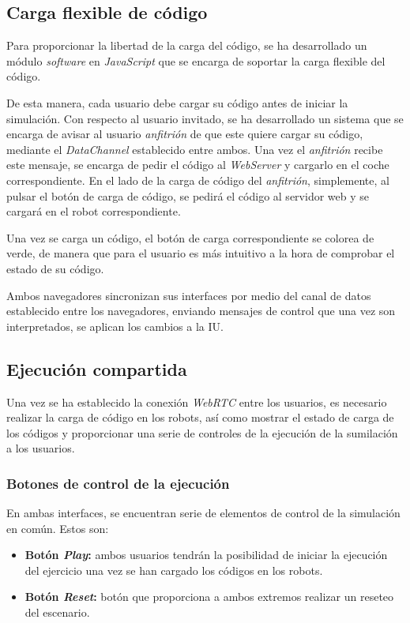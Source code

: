 \documentclass[a4paper, 12pt]{book}
\begin{document}
\subsection{Carga flexible de código}

Para proporcionar la libertad de la carga del código, se ha desarrollado un módulo \emph{software} en \emph{JavaScript} que se encarga de soportar la carga flexible del código.

De esta manera, cada usuario debe cargar su código antes de iniciar la simulación. Con respecto al usuario invitado, se ha desarrollado un sistema que se encarga de avisar al usuario \emph{anfitrión} de que este quiere cargar su código, mediante el \emph{DataChannel} establecido entre ambos. Una vez el \emph{anfitrión} recibe este mensaje, se encarga de pedir el código al \emph{WebServer} y cargarlo en el coche correspondiente. En el lado de la carga de código del \emph{anfitrión}, simplemente, al pulsar el botón de carga de código, se pedirá el código al servidor web y se cargará en el robot correspondiente.

Una vez se carga un código, el botón de carga correspondiente se colorea de verde, de manera que para el usuario es más intuitivo a la hora de comprobar el estado de su código.

Ambos navegadores sincronizan sus interfaces por medio del canal de datos establecido entre los navegadores, enviando mensajes de control que una vez son interpretados, se aplican los cambios a la IU.

\subsection{Ejecución compartida}

Una vez se ha establecido la conexión \emph{WebRTC} entre los usuarios, es necesario realizar la carga de código en los robots, así como mostrar el estado de carga de los códigos y proporcionar una serie de controles de la ejecución de la sumilación a los usuarios.

\subsubsection{Botones de control de la ejecución}

En ambas interfaces, se encuentran serie de elementos de control de la simulación en común. Estos son:

\begin{itemize}
\item \textbf{Botón \emph{Play}:} ambos usuarios tendrán la posibilidad de iniciar la ejecución del ejercicio una vez se han cargado los códigos en los robots.

\item \textbf{Botón \emph{Reset}:} botón que proporciona a ambos extremos realizar un reseteo del escenario.
\end{itemize}
\end{document}

